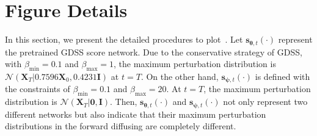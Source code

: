 \documentclass{article}
\newcommand{\s}{{{\bm s}}}
\newcommand{\X}{{{\bm X}}}
\newcommand{\THETA}{{\bm\theta}}
\newcommand{\PSI}{{\bm\psi}}
\begin{document}
\begin{table}[!b]
\caption{The actual parameters of the forward perturbation of GSDM and MOOD.}\label{tab:start_bias_gsdm}\vspace{-3mm}
\centering
{}
\end{table}
\section{Figure Details}
\label{appendix:B.Figures detail}
In this section, we present the detailed procedures to plot~. Let $\s_{\THETA,t}(\cdot)$ represent the pretrained GDSS score network. Due to the conservative strategy of GDSS, with $\beta_{\min}=0.1$ and $\beta_{\max}=1$, the maximum perturbation distribution is $\mathcal{N}\left(\X_T|0.7596\X_0,0.4231\mathbf{I}\right)$ at $t=T$. On the other hand, $\s_{\PSI,t}(\cdot)$ is defined with the constraints of $\beta_{\min}=0.1$ and $\beta_{\max}=20$. At $t=T$, the maximum perturbation distribution is $\mathcal{N}(\X_T|\textbf{0},\mathbf{I})$. Then, $\s_{\THETA,t}(\cdot)$ and $\s_{\PSI,t}(\cdot)$ not only represent two different networks but also indicate that their maximum perturbation distributions in the forward diffusing are completely different. 
\end{document}

